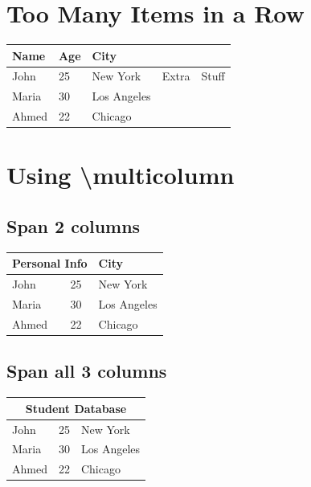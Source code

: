 \documentclass{article}
\begin{document}
\section{Too Many Items in a Row}
\begin{tabular}{lll}
\toprule
Name & Age & City \\
\midrule
John & 25 & New York & Extra & Stuff \\  %
Maria & 30 & Los Angeles \\
Ahmed & 22 & Chicago \\
\bottomrule
\end{tabular}

\section{Using \textbackslash multicolumn}

\subsection{Span 2 columns}
\begin{tabular}{lll}
\toprule
\multicolumn{2}{c}{Personal Info} & City \\
\midrule
John & 25 & New York \\
Maria & 30 & Los Angeles \\
Ahmed & 22 & Chicago \\
\bottomrule
\end{tabular}

\subsection{Span all 3 columns}
\begin{tabular}{lll}
\toprule
\multicolumn{3}{c}{Student Database} \\
\midrule
John & 25 & New York \\
Maria & 30 & Los Angeles \\
Ahmed & 22 & Chicago \\
\bottomrule
\end{tabular}
\end{document}
